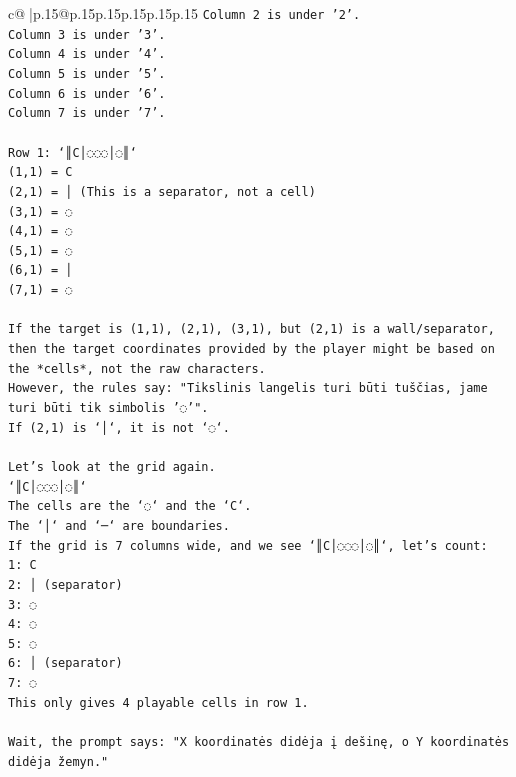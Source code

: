 \documentclass{article}
\begin{document}
{\begin{supertabular}{c@{$\;$}|p{.15\linewidth}@{}p{.15\linewidth}p{.15\linewidth}p{.15\linewidth}p{.15\linewidth}p{.15\linewidth}}
{{{\texttt{Column 2 is under '2'.} \\
\texttt{Column 3 is under '3'.} \\
\texttt{Column 4 is under '4'.} \\
\texttt{Column 5 is under '5'.} \\
\texttt{Column 6 is under '6'.} \\
\texttt{Column 7 is under '7'.} \\
\\ 
\texttt{Row 1: `║C│◌◌◌│◌║`} \\
\texttt{(1,1) = C} \\
\texttt{(2,1) = │ (This is a separator, not a cell)} \\
\texttt{(3,1) = ◌} \\
\texttt{(4,1) = ◌} \\
\texttt{(5,1) = ◌} \\
\texttt{(6,1) = │} \\
\texttt{(7,1) = ◌} \\
\\ 
\texttt{If the target is (1,1), (2,1), (3,1), but (2,1) is a wall/separator, then the target coordinates provided by the player might be based on the *cells*, not the raw characters.} \\
\texttt{However, the rules say: "Tikslinis langelis turi būti tuščias, jame turi būti tik simbolis '◌'".} \\
\texttt{If (2,1) is `│`, it is not `◌`.} \\
\\ 
\texttt{Let's look at the grid again.} \\
\texttt{`║C│◌◌◌│◌║`} \\
\texttt{The cells are the `◌` and the `C`.} \\
\texttt{The `│` and `─` are boundaries.} \\
\texttt{If the grid is 7 columns wide, and we see `║C│◌◌◌│◌║`, let's count:} \\
\texttt{1: C} \\
\texttt{2: │ (separator)} \\
\texttt{3: ◌} \\
\texttt{4: ◌} \\
\texttt{5: ◌} \\
\texttt{6: │ (separator)} \\
\texttt{7: ◌} \\
\texttt{This only gives 4 playable cells in row 1.} \\
\\ 
\texttt{Wait, the prompt says: "X koordinatės didėja į dešinę, o Y koordinatės didėja žemyn."} \\
}}}
\end{supertabular}}
\end{document}
